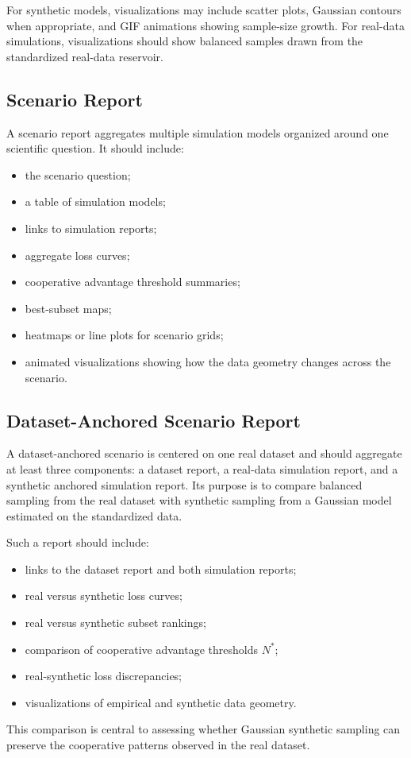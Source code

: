 \documentclass[11pt,a4paper]{article}
\begin{document}
For synthetic models, visualizations may include scatter plots, Gaussian contours when appropriate, and GIF animations showing sample-size growth. For real-data simulations, visualizations should show balanced samples drawn from the standardized real-data reservoir.

\subsection{Scenario Report}

A scenario report aggregates multiple simulation models organized around one scientific question. It should include:
\begin{itemize}
    \item the scenario question;
    \item a table of simulation models;
    \item links to simulation reports;
    \item aggregate loss curves;
    \item cooperative advantage threshold summaries;
    \item best-subset maps;
    \item heatmaps or line plots for scenario grids;
    \item animated visualizations showing how the data geometry changes across the scenario.
\end{itemize}

\subsection{Dataset-Anchored Scenario Report}

A dataset-anchored scenario is centered on one real dataset and should aggregate at least three components: a dataset report, a real-data simulation report, and a synthetic anchored simulation report. Its purpose is to compare balanced sampling from the real dataset with synthetic sampling from a Gaussian model estimated on the standardized data.

Such a report should include:
\begin{itemize}
    \item links to the dataset report and both simulation reports;
    \item real versus synthetic loss curves;
    \item real versus synthetic subset rankings;
    \item comparison of cooperative advantage thresholds $N^*$;
    \item real-synthetic loss discrepancies;
    \item visualizations of empirical and synthetic data geometry.
\end{itemize}

This comparison is central to assessing whether Gaussian synthetic sampling can preserve the cooperative patterns observed in the real dataset.
\end{document}
